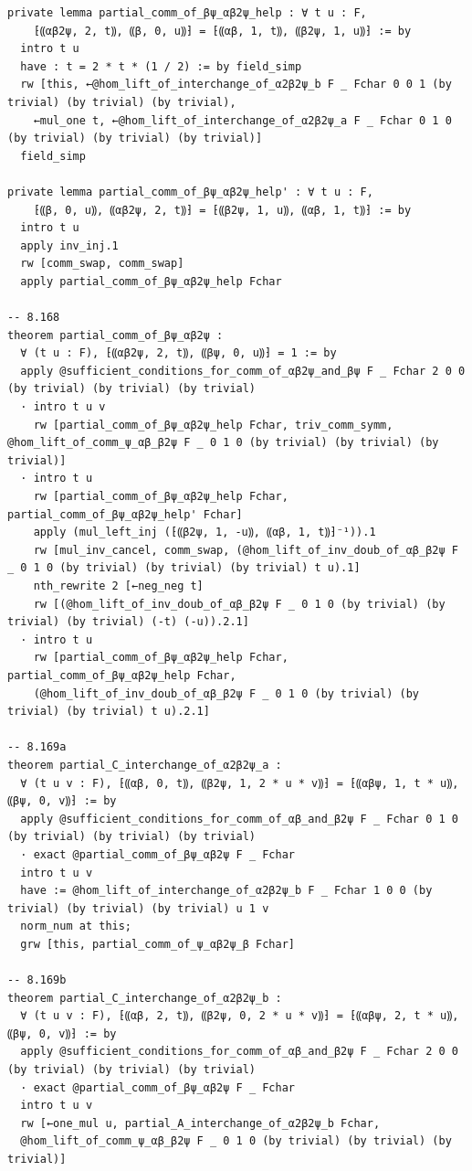 \begin{Verbatim}
private lemma partial_comm_of_βψ_αβ2ψ_help : ∀ t u : F,
    ⁅⸨αβ2ψ, 2, t⸩, ⸨β, 0, u⸩⁆ = ⁅⸨αβ, 1, t⸩, ⸨β2ψ, 1, u⸩⁆ := by
  intro t u
  have : t = 2 * t * (1 / 2) := by field_simp
  rw [this, ←@hom_lift_of_interchange_of_α2β2ψ_b F _ Fchar 0 0 1 (by trivial) (by trivial) (by trivial),
    ←mul_one t, ←@hom_lift_of_interchange_of_α2β2ψ_a F _ Fchar 0 1 0 (by trivial) (by trivial) (by trivial)]
  field_simp

private lemma partial_comm_of_βψ_αβ2ψ_help' : ∀ t u : F,
    ⁅⸨β, 0, u⸩, ⸨αβ2ψ, 2, t⸩⁆ = ⁅⸨β2ψ, 1, u⸩, ⸨αβ, 1, t⸩⁆ := by
  intro t u
  apply inv_inj.1
  rw [comm_swap, comm_swap]
  apply partial_comm_of_βψ_αβ2ψ_help Fchar

-- 8.168
theorem partial_comm_of_βψ_αβ2ψ :
  ∀ (t u : F), ⁅⸨αβ2ψ, 2, t⸩, ⸨βψ, 0, u⸩⁆ = 1 := by
  apply @sufficient_conditions_for_comm_of_αβ2ψ_and_βψ F _ Fchar 2 0 0 (by trivial) (by trivial) (by trivial)
  · intro t u v
    rw [partial_comm_of_βψ_αβ2ψ_help Fchar, triv_comm_symm, @hom_lift_of_comm_ψ_αβ_β2ψ F _ 0 1 0 (by trivial) (by trivial) (by trivial)]
  · intro t u
    rw [partial_comm_of_βψ_αβ2ψ_help Fchar, partial_comm_of_βψ_αβ2ψ_help' Fchar]
    apply (mul_left_inj (⁅⸨β2ψ, 1, -u⸩, ⸨αβ, 1, t⸩⁆⁻¹)).1
    rw [mul_inv_cancel, comm_swap, (@hom_lift_of_inv_doub_of_αβ_β2ψ F _ 0 1 0 (by trivial) (by trivial) (by trivial) t u).1]
    nth_rewrite 2 [←neg_neg t]
    rw [(@hom_lift_of_inv_doub_of_αβ_β2ψ F _ 0 1 0 (by trivial) (by trivial) (by trivial) (-t) (-u)).2.1]
  · intro t u
    rw [partial_comm_of_βψ_αβ2ψ_help Fchar, partial_comm_of_βψ_αβ2ψ_help Fchar,
    (@hom_lift_of_inv_doub_of_αβ_β2ψ F _ 0 1 0 (by trivial) (by trivial) (by trivial) t u).2.1]

-- 8.169a
theorem partial_C_interchange_of_α2β2ψ_a :
  ∀ (t u v : F), ⁅⸨αβ, 0, t⸩, ⸨β2ψ, 1, 2 * u * v⸩⁆ = ⁅⸨αβψ, 1, t * u⸩, ⸨βψ, 0, v⸩⁆ := by
  apply @sufficient_conditions_for_comm_of_αβ_and_β2ψ F _ Fchar 0 1 0 (by trivial) (by trivial) (by trivial)
  · exact @partial_comm_of_βψ_αβ2ψ F _ Fchar
  intro t u v
  have := @hom_lift_of_interchange_of_α2β2ψ_b F _ Fchar 1 0 0 (by trivial) (by trivial) (by trivial) u 1 v
  norm_num at this;
  grw [this, partial_comm_of_ψ_αβ2ψ_β Fchar]

-- 8.169b
theorem partial_C_interchange_of_α2β2ψ_b :
  ∀ (t u v : F), ⁅⸨αβ, 2, t⸩, ⸨β2ψ, 0, 2 * u * v⸩⁆ = ⁅⸨αβψ, 2, t * u⸩, ⸨βψ, 0, v⸩⁆ := by
  apply @sufficient_conditions_for_comm_of_αβ_and_β2ψ F _ Fchar 2 0 0 (by trivial) (by trivial) (by trivial)
  · exact @partial_comm_of_βψ_αβ2ψ F _ Fchar
  intro t u v
  rw [←one_mul u, partial_A_interchange_of_α2β2ψ_b Fchar,
  @hom_lift_of_comm_ψ_αβ_β2ψ F _ 0 1 0 (by trivial) (by trivial) (by trivial)]


\end{Verbatim}
